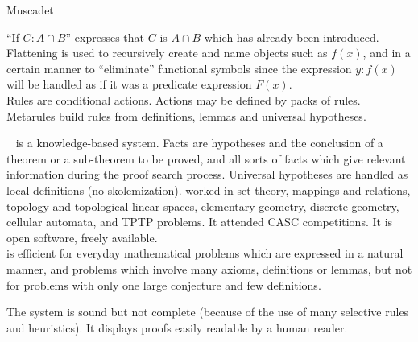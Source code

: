 \begin{entry}{Muscadet}
\begin{clarifications}
``If $C:A \cap B$'' expresses that $C$ is 
$A \cap B$ which has already been introduced.
Flattening is used to recursively create and name objects such as $f(x)$,
and in a certain manner to ``eliminate'' functional symbols since
the expression ${y:f(x)}$ will be handled as if 
it was a predicate expression $F(x)$. \\
Rules are conditional actions. Actions may be defined by packs of rules. 
Metarules build rules from definitions, lemmas and universal hypotheses. 
\end{clarifications}

\begin{history}
{\sc \Muscadet}~\cite{pastre:1989,pastre:1993} is a knowledge-based system.
Facts are hypotheses and the conclusion 
of a theorem or a sub-theorem to be proved,
and all sorts of facts which give relevant information
during the proof search process.
Universal hypotheses are handled as local definitions (no skolemization). 
\Muscadet worked in set theory, mappings and relations, 
topology and topological linear spaces, elementary geometry, discrete geometry, 
cellular automata, and TPTP problems. 
It attended CASC competitions.
It is open software, freely available.\\
\Muscadet is efficient for everyday mathematical problems 
which are expressed in a natural manner,
and problems which involve many axioms, definitions or lemmas, 
but not  for problems with only one large conjecture and few definitions.
\end{history}

\begin{technicalities}
The system is sound but not complete (because of the use of many 
selective rules and heuristics).
It displays proofs easily readable by a human reader.
\end{technicalities}
\nocite{pastre:2011}


\end{entry}

